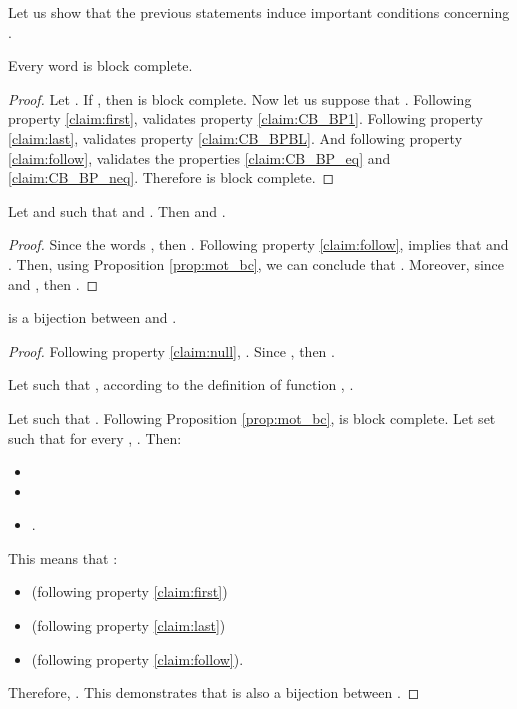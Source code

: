 \documentclass{llncs}
\begin{document}
	
	

	Let us show that the previous statements induce important conditions concerning .

\begin{proposition}\label{prop:mot_bc}
	Every word  is block complete.
\end{proposition}
\begin{proof}
	Let .
	If , then  is block complete.
	Now let us suppose that .
	Following property \eqref{claim:first},  validates property \eqref{claim:CB_BP1}.
	Following property \eqref{claim:last},  validates property \eqref{claim:CB_BPBL}.
	And following property \eqref{claim:follow},  validates the properties \eqref{claim:CB_BP_eq} and \eqref{claim:CB_BP_neq}.
	Therefore  is block complete.
\end{proof}


\begin{proposition}\label{prop:fourche}
	Let  and  such that  and .
	Then  and .
\end{proposition}
\begin{proof}
	Since the words , then .
	Following property \eqref{claim:follow},  implies that   and .
	Then, using Proposition \ref{prop:mot_bc}, we can conclude that .
	Moreover, since  and , then .
\end{proof}


\begin{proposition}\label{prop:bijectionLangage}
	 is a bijection between  and .
\end{proposition}
\begin{proof}
	Following property \eqref{claim:null}, .
	Since , then .

	Let  such that , according to the definition of function , .
	
	Let  such that .
	Following Proposition \ref{prop:mot_bc},  is block complete.
	Let set  such that for every , .
	Then:
	\begin{itemize}
		\item 
		\item 
		\item .
	\end{itemize}
	This means that :
	\begin{itemize}
		\item  (following property \eqref{claim:first})
		\item  (following property \eqref{claim:last})
		\item  (following property \eqref{claim:follow}).
	\end{itemize}
	Therefore, .
	This demonstrates that  is also a bijection between .
\end{proof}
\end{document}
